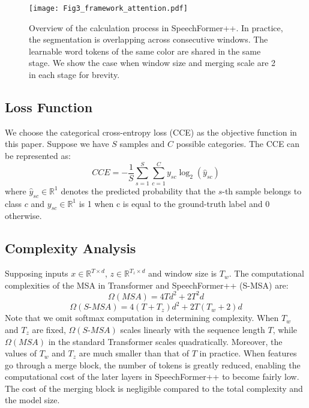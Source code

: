 \documentclass[lettersize,journal]{IEEEtran}
\begin{document}
\begin{figure}[t]
\centering
\texttt{[image: Fig3\_framework\_attention.pdf]}
\caption{Overview of the calculation process in SpeechFormer++. In practice, the segmentation is overlapping across consecutive windows. The learnable word tokens of the same color are shared in the same stage. We show the case when window size and merging scale are 2 in each stage for brevity.
}
\label{fig_4}
\end{figure}

\subsection{Loss Function}
We choose the categorical cross-entropy loss (CCE) as the objective function in this paper. Suppose we have $S$ samples and $C$ possible categories. The CCE can be represented as:
\begin{equation}
    CCE = -\frac{1}{S}\sum_{s=1}^S\sum_{c=1}^C y_{sc}\log_2(\hat{y}_{sc})
    \label{eq19}
\end{equation}
where $\hat{y}_{sc} \in \mathbb{R}^{1}$ denotes the predicted probability that the $s$-th sample belongs to class $c$ and $y_{sc} \in \mathbb{R}^{1}$ is 1 when c is equal to the ground-truth label and 0 otherwise.

\subsection{Complexity Analysis}
Supposing inputs $x \in \mathbb{R}^{T \times d}$, $z \in \mathbb{R}^{T_z \times d}$ and window size is $T_w$. The computational complexities of the MSA in Transformer and SpeechFormer++ (S-MSA) are:
\begin{equation}
    \Omega(MSA) = 4Td^2+2T^2d
\label{eq17}
\end{equation}
\begin{equation}
    \Omega(S\mbox{-}MSA) = 4(T+T_z)d^2+2T(T_w+2)d
\label{eq18}
\end{equation}
Note that we omit softmax computation in determining complexity. When $T_w$ and $T_z$ are fixed, $\Omega(S\mbox{-}MSA)$ scales linearly with the sequence length $T$, while $\Omega(MSA)$ in the standard Transformer scales quadratically. Moreover, the values of $T_w$ and $T_z$ are much smaller than that of $T$ in practice. When features go through a merge block, the number of tokens is greatly reduced, enabling the computational cost of the later layers in SpeechFormer++ to become fairly low. The cost of the merging block is negligible compared to the total complexity and the model size.
\end{document}
